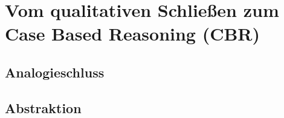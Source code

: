 \documentclass[a4paper]{article}
\title{\docTitle}
\author{Moritz}
\date{\today}
\begin{document}
\maketitle
\tableofcontents


\section{Vom qualitativen Schließen zum Case Based Reasoning (CBR)}

\subsection{Analogieschluss}

\subsection{Abstraktion}

\end{document}

